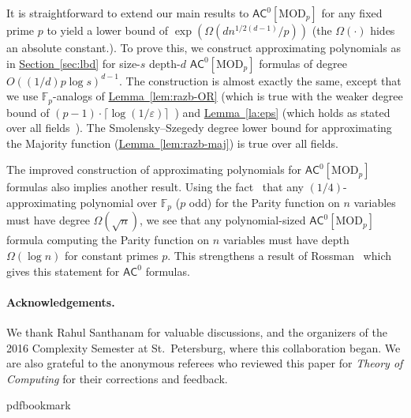 \documentclass[11pt]{article}
\numberwithin{equation}{section}
\theoremstyle{definition}
\theoremstyle{plain}
\newcommand{\cclass}[1]{\textsf{#1}}
\newcommand{\expref}[2]{\hyperref[#2]{#1~\ref{#2}}}
\newcommand{\F}{\mathbb{F}}
\newcommand{\AC}{\cclass{AC}}
\begin{document}
%
%
It is straightforward to extend our main results  %
to $\AC^0[\mathrm{MOD}_p]$ for any fixed prime $p$ to yield a lower bound
of $\exp(\Omega(dn^{1/2(d-1)}/p))$ (the $\Omega(\cdot)$ hides an absolute constant.). To prove this, we construct approximating polynomials as in \expref{Section}{sec:lbd} for size-$s$ depth-$d$ $\AC^0[\mathrm{MOD}_p]$ formulas of degree $O(({1}/{d})p\log s)^{d-1}$. The construction is almost exactly the same,
except that we use $\F_p$-analogs of \expref{Lemma}{lem:razb-OR} (which is
true with the weaker degree bound of
$(p-1)\cdot \lceil \log(1/\varepsilon)\rceil$~\cite{Smolensky87})
and \expref{Lemma}{la:eps} (which holds as stated over all fields~\cite{HS}).
%
The Smolensky--Szegedy  %
degree lower bound for approximating the Majority function
(\expref{Lemma}{lem:razb-maj}) is true over all fields.

The improved construction of approximating polynomials for $\AC^0[\mathrm{MOD}_p]$ formulas also implies another result. Using the fact~\cite{Smolensky87} that any $(1/4)$-approximating polynomial over $\F_p$ ($p$ odd) for the Parity function on $n$ variables must have degree $\Omega(\sqrt{n})$, we see that any polynomial-sized $\AC^0[\mathrm{MOD}_p]$ formula computing the Parity function on $n$ variables must have depth $\Omega(\log n)$ for constant primes $p$. This strengthens a result of Rossman~\cite{Rossman2015average} which gives this statement for $\AC^0$ formulas.


\paragraph{Acknowledgements.}

We thank Rahul Santhanam for valuable discussions, and the organizers of the 2016 Complexity Semester at St.\ Petersburg, where this collaboration began. We are also grateful to the anonymous referees who reviewed this paper for \emph{Theory of Computing} for their corrections and feedback.


%

\nocite{savicky2000number}

\providecommand{\bibhead}[1]{}
\expandafter\ifx\csname pdfbookmark\endcsname\relax%
  \providecommand{\tocrefpdfbookmark}{}
\else\providecommand{\tocrefpdfbookmark}{%
   \hypertarget{tocreferences}{}%
   \pdfbookmark[1]{References}{tocreferences}}%
\fi
\end{document}
